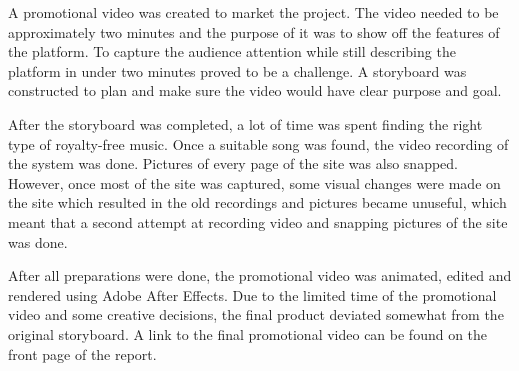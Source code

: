 A promotional video was created to market the project. The video needed to be approximately two minutes and the purpose of it was to show off the features of the platform.
To capture the audience attention while still describing the platform in under two minutes proved to be a challenge. A storyboard was constructed to plan and make sure the video would have clear purpose and goal.


After the storyboard was completed, a lot of time was spent finding the right type of royalty-free music. Once a suitable song was found, the video recording of the system was done. Pictures of every page of the site was also snapped. However, once most of the site was captured, some visual changes were made on the site which resulted in the old recordings and pictures became unuseful, which meant that a second attempt at recording video and snapping pictures of the site was done.

After all preparations were done, the promotional video was animated, edited and rendered using Adobe After Effects. Due to the limited time of the promotional video and some creative decisions, the final product deviated somewhat from the original storyboard. A link to the final promotional video can be found on the front page of the report.
